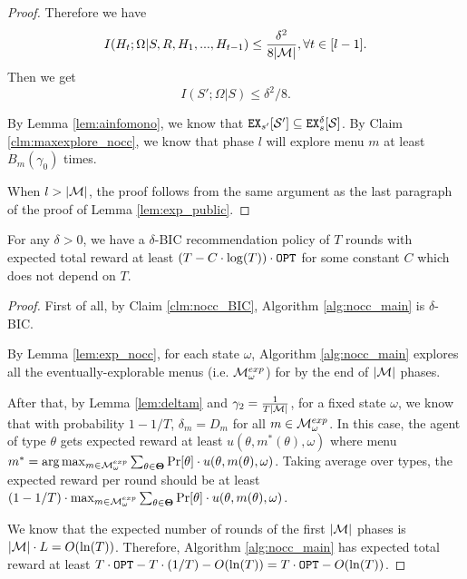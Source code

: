 \begin{proof}
Therefore we have
\[
I(H_t; \Omega|S,R,H_1,...,H_{t-1}) \leq \frac{\delta^2}{8|\mathcal{M}|}, \forall t \in [l-1].
\]
Then we get 
\[
I(S'; \Omega | S) \leq \delta^2/8.
\]

By Lemma \ref{lem:ainfomono}, we know that $\mathtt{EX}_{s'}[\mathcal{S}'] \subseteq \mathtt{EX}^{\delta}_s[\mathcal{S}]$. By Claim \ref{clm:maxexplore_nocc}, we know that phase $l$ will explore menu $m$ at least $B_m(\gamma_0)$ times.

When $l > |\mathcal{M}|$, the proof follows from the same argument as the last paragraph of the proof of Lemma \ref{lem:exp_public}.
\end{proof}

\begin{corollary}
\label{cor:private_nocc}
For any $\delta > 0$, we have a $\delta$-BIC recommendation policy of $T$ rounds with expected total reward at least $\left(T - C\cdot \log(T) \right) \cdot \mathtt{OPT}$ for some constant $C$ which does not depend on $T$. 
\end{corollary}

\begin{proof}

First of all, by Claim \ref{clm:nocc_BIC}, Algorithm \ref{alg:nocc_main} is $\delta$-BIC. 

By Lemma \ref{lem:exp_nocc}, for each state $\omega$, Algorithm \ref{alg:nocc_main} explores all the eventually-explorable menus (i.e. $\mathcal{M}_{\omega}^{exp}$) for by the end of $|\mathcal{M}|$ phases. 

After that, by Lemma \ref{lem:deltam} and $\gamma_2 = \frac{1}{T|\mathcal{M}|}$, for a fixed state $\omega$, we know that with probability $1- 1/T$, $\delta_m = D_m$ for all $m \in \mathcal{M}_{\omega}^{exp}$. In this case, the agent of type $\theta$ gets expected reward at least $u(\theta,m^*(\theta),\omega)$ where menu $m^* =\arg\max_{m \in \mathcal{M}_{\omega}^{exp}} \sum_{\theta \in \bold{\Theta}} \Pr[\theta] \cdot u(\theta, m(\theta), \omega)$. Taking average over types, the expected reward per round should be at least $(1-1/T) \cdot \max_{m \in \mathcal{M}_{\omega}^{exp}} \sum_{\theta \in \bold{\Theta}} \Pr[\theta] \cdot u(\theta, m(\theta), \omega)$.

We know that the expected number of rounds of the first $|\mathcal{M}|$ phases is $|\mathcal{M}| \cdot L = O(\ln(T))$. Therefore, Algorithm \ref{alg:nocc_main} has expected total reward at least $T \cdot \mathtt{OPT}- T \cdot (1/T) - O(\ln(T)) = T\cdot \mathtt{OPT} - O(\ln(T))$.

\end{proof}

